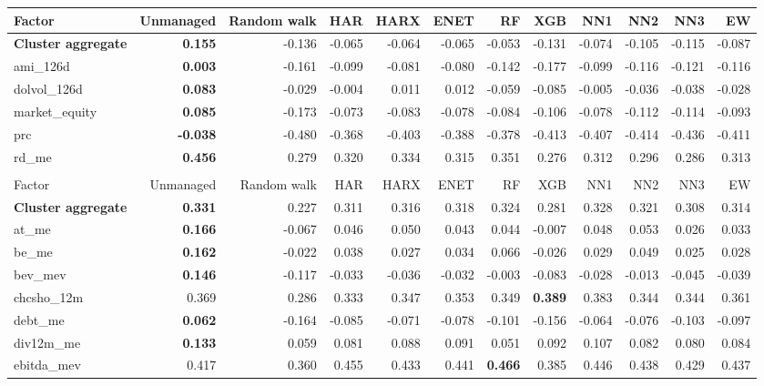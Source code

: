 \begin{landscape}
\begin{longtable}{>{\raggedright\arraybackslash}p{2.6cm}rrrrrrrrrrr}
\hline
Factor & Unmanaged & Random walk & HAR & HARX & ENET & RF & XGB & NN1 & NN2 & NN3 & EW \\
\hline
\textbf{Cluster aggregate} & \textbf{0.155} & -0.136 & -0.065 & -0.064 & -0.065 & -0.053 & -0.131 & -0.074 & -0.105 & -0.115 & -0.087 \\
ami\_126d & \textbf{0.003} & -0.161 & -0.099 & -0.081 & -0.080 & -0.142 & -0.177 & -0.099 & -0.116 & -0.121 & -0.116 \\
dolvol\_126d & \textbf{0.083} & -0.029 & -0.004 & 0.011 & 0.012 & -0.059 & -0.085 & -0.005 & -0.036 & -0.038 & -0.028 \\
market\_equity & \textbf{0.085} & -0.173 & -0.073 & -0.083 & -0.078 & -0.084 & -0.106 & -0.078 & -0.112 & -0.114 & -0.093 \\
prc & \textbf{-0.038} & -0.480 & -0.368 & -0.403 & -0.388 & -0.378 & -0.413 & -0.407 & -0.414 & -0.436 & -0.411 \\
rd\_me & \textbf{0.456} & 0.279 & 0.320 & 0.334 & 0.315 & 0.351 & 0.276 & 0.312 & 0.296 & 0.286 & 0.313 \\
\hline
\multicolumn{12}{@{}l}{\textit{Panel M. Value}} \\
\hline
Factor & Unmanaged & Random walk & HAR & HARX & ENET & RF & XGB & NN1 & NN2 & NN3 & EW \\
\hline
\textbf{Cluster aggregate} & \textbf{0.331} & 0.227 & 0.311 & 0.316 & 0.318 & 0.324 & 0.281 & 0.328 & 0.321 & 0.308 & 0.314 \\
at\_me & \textbf{0.166} & -0.067 & 0.046 & 0.050 & 0.043 & 0.044 & -0.007 & 0.048 & 0.053 & 0.026 & 0.033 \\
be\_me & \textbf{0.162} & -0.022 & 0.038 & 0.027 & 0.034 & 0.066 & -0.026 & 0.029 & 0.049 & 0.025 & 0.028 \\
bev\_mev & \textbf{0.146} & -0.117 & -0.033 & -0.036 & -0.032 & -0.003 & -0.083 & -0.028 & -0.013 & -0.045 & -0.039 \\
chcsho\_12m & 0.369 & 0.286 & 0.333 & 0.347 & 0.353 & 0.349 & \textbf{\cellcolor{blue!10}0.389} & \cellcolor{blue!10}0.383 & 0.344 & 0.344 & 0.361 \\
debt\_me & \textbf{0.062} & -0.164 & -0.085 & -0.071 & -0.078 & -0.101 & -0.156 & -0.064 & -0.076 & -0.103 & -0.097 \\
div12m\_me & \textbf{0.133} & 0.059 & 0.081 & 0.088 & 0.091 & 0.051 & 0.092 & 0.107 & 0.082 & 0.080 & 0.084 \\
ebitda\_mev & 0.417 & 0.360 & \cellcolor{blue!10}0.455 & \cellcolor{blue!10}0.433 & \cellcolor{blue!10}0.441 & \textbf{\cellcolor{blue!10}0.466} & 0.385 & \cellcolor{blue!10}0.446 & \cellcolor{blue!10}0.438 & \cellcolor{blue!10}0.429 & \cellcolor{blue!10}0.437 \\

\end{longtable}
\end{landscape}
